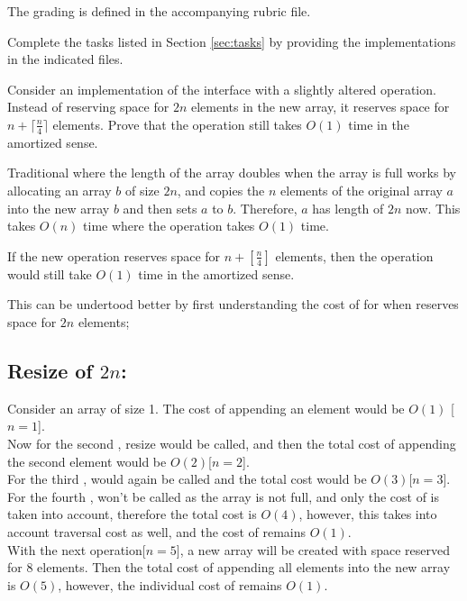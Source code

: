 \documentclass[addpoints]{exam}
\begin{document}
The grading is defined in the accompanying rubric file.
\begin{questions}
   Complete the tasks listed in Section \ref{sec:tasks} by providing the implementations in the indicated files.


  Consider an  implementation of the  interface with a slightly altered  operation. Instead of reserving space for $2n$ elements in the new array, it reserves space for $n + \lceil \frac{n}{4} \rceil$ elements. Prove that the  operation still takes $O(1)$ time in the amortized sense.
  \begin{solution}
    
    Traditional  where the length of the array doubles when the array is full works by allocating an array $b$ of size $ 2n $, and copies the $n$ elements of the original array $a$ into the new array $b$ and then sets $a$ to $b$. Therefore, $a$ has length of $2n$ now. This takes $O(n)$ time where the  operation takes $ O(1) $ time.

    If the new  operation reserves space for $ n + [\frac{n}{4}] $ elements, then the  operation would still take $O(1)$ time in the amortized sense.
    
    This can be undertood better by first understanding the cost of  for when  reserves space for $2n$ elements; 

    \subsection*{Resize of $2n$:}
    Consider an array of size 1. The cost of appending an element would be $ O(1) $ [$n = 1$]. \\ Now for the second , resize would be called, and then the total cost of appending the second element would be $O(2)$[$n = 2$]. \\ For the third ,  would again be called and the total cost would be $O(3)$[$n = 3$]. \\ 
    For the fourth ,  won't be called as the array is not full, and only the cost of  is taken into account, therefore the total cost is $O(4)$, however, this takes into account traversal cost as well, and the cost of  remains $ O(1) $. \\ With the next  operation[$n = 5$], a new array will be created with space reserved for 8 elements. Then the total cost of appending all elements into the new array is $ O(5) $, however, the individual cost of  remains $O(1)$. 
    

\end{solution}
\end{questions}
\end{document}
